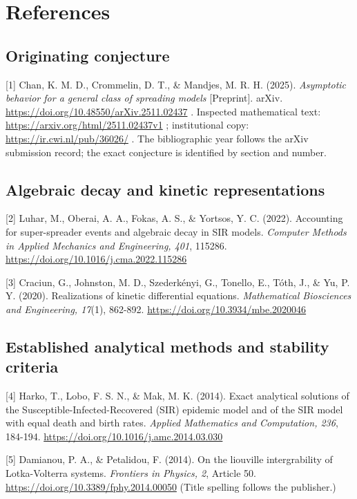 \documentclass[
  11pt,
  a4paper,
]{scrartcl}
\begin{document}
\section{References}\label{references}

\subsection{Originating conjecture}\label{originating-conjecture}

{[}1{]} Chan, K. M. D., Crommelin, D. T., \& Mandjes, M. R. H. (2025).
\emph{Asymptotic behavior for a general class of spreading models}
{[}Preprint{]}. arXiv. \url{https://doi.org/10.48550/arXiv.2511.02437} .
Inspected mathematical text: \url{https://arxiv.org/html/2511.02437v1} ;
institutional copy: \url{https://ir.cwi.nl/pub/36026/} . The
bibliographic year follows the arXiv submission record; the exact
conjecture is identified by section and number.

\subsection{Algebraic decay and kinetic
representations}\label{algebraic-decay-and-kinetic-representations}

{[}2{]} Luhar, M., Oberai, A. A., Fokas, A. S., \& Yortsos, Y. C.
(2022). Accounting for super-spreader events and algebraic decay in SIR
models. \emph{Computer Methods in Applied Mechanics and Engineering,
401}, 115286. \url{https://doi.org/10.1016/j.cma.2022.115286}

{[}3{]} Craciun, G., Johnston, M. D., Szederkényi, G., Tonello, E.,
Tóth, J., \& Yu, P. Y. (2020). Realizations of kinetic differential
equations. \emph{Mathematical Biosciences and Engineering, 17}(1),
862-892. \url{https://doi.org/10.3934/mbe.2020046}

\subsection{Established analytical methods and stability
criteria}\label{established-analytical-methods-and-stability-criteria}

{[}4{]} Harko, T., Lobo, F. S. N., \& Mak, M. K. (2014). Exact
analytical solutions of the Susceptible-Infected-Recovered (SIR)
epidemic model and of the SIR model with equal death and birth rates.
\emph{Applied Mathematics and Computation, 236}, 184-194.
\url{https://doi.org/10.1016/j.amc.2014.03.030}

{[}5{]} Damianou, P. A., \& Petalidou, F. (2014). On the liouville
intergrability of Lotka-Volterra systems. \emph{Frontiers in Physics,
2}, Article 50. \url{https://doi.org/10.3389/fphy.2014.00050} (Title
spelling follows the publisher.)
\end{document}
